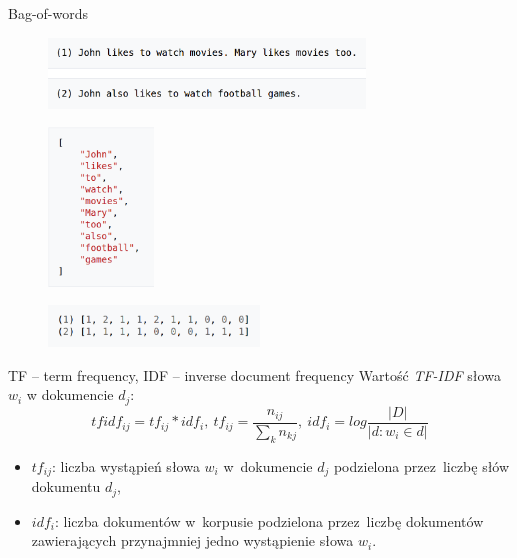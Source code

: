 \documentclass{beamer}
\begin{document}
	\begin{frame}{Bag-of-words}
		\begin{figure}
			\centering
			\includegraphics[width=0.75\textwidth]{img/bow_sents.png}
		\end{figure}
		\pause
		\begin{figure}
			\centering
			\includegraphics[width=0.25\textwidth]{img/bow_dict.png}
		\end{figure}
		\pause
		\begin{figure}
			\centering
			\includegraphics[width=0.5\textwidth]{img/bow_repr.png}
		\end{figure}
	\end{frame}
	\begin{frame}{TF – term frequency, IDF – inverse document frequency}
		Wartość \textit{TF-IDF} słowa $w_i$ w dokumencie $d_j$:
		\begin{equation}
		\label{eq:tf-idf}
		tfidf_{ij} = tf_{ij} * idf_i,\ tf_{ij} = \frac{n_{ij}}{\sum\limits_{k}n_{kj}},\ idf_i = log\frac{|D|}{|{d:w_i \in d}|}
		\end{equation}
		\begin{itemize}
			\item $tf_{ij}$: liczba wystąpień słowa $w_i$ w~dokumencie $d_j$ podzielona przez~liczbę słów dokumentu $d_j$,
			\item $idf_i$: liczba dokumentów w~korpusie podzielona przez~liczbę dokumentów zawierających przynajmniej jedno wystąpienie słowa $w_i$.
		\end{itemize}
	\end{frame}
\end{document}
